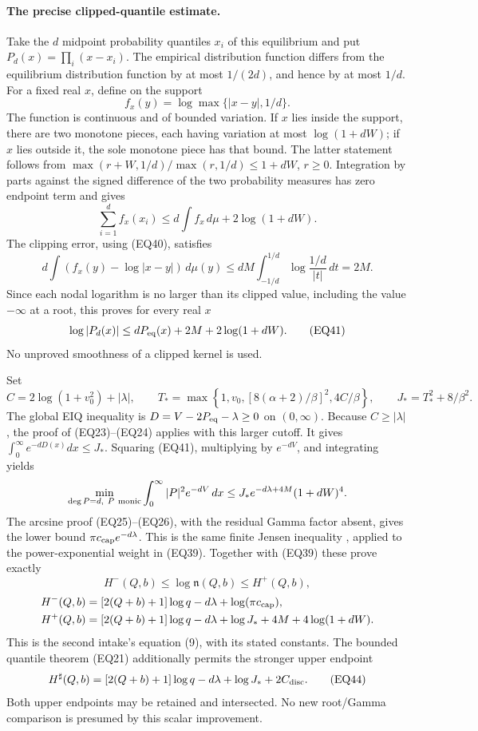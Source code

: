 \paragraph{The precise clipped-quantile estimate.}
Take the \(d\) midpoint probability quantiles \(x_i\) of this equilibrium
and put \(P_d(x)=\prod_i(x-x_i)\).  The empirical distribution function
differs from the equilibrium distribution function by at most \(1/(2d)\),
and hence by at most \(1/d\).  For a fixed real \(x\), define on the
support
\[
 f_x(y)=\log\max\{|x-y|,1/d\}.
\]
The function is continuous and of bounded variation.  If \(x\) lies
inside the support, there are two monotone pieces, each having variation
at most \(\log(1+dW)\); if \(x\) lies outside it, the sole monotone
piece has that bound.  The latter statement follows from
\(\max(r+W,1/d)/\max(r,1/d)\le1+dW\), \(r\ge0\).
Integration by parts against the signed difference of the two
probability measures has zero endpoint term and gives
\[
 \sum_{i=1}^d f_x(x_i)\le
 d\int f_x\,d\mu+2\log(1+dW).
\]
The clipping error, using (EQ40), satisfies
\[
 d\int(f_x(y)-\log|x-y|)\,d\mu(y)
 \le dM\int_{-1/d}^{1/d}\log\frac{1/d}{|t|}\,dt=2M.
\]
Since each nodal logarithm is no larger than its clipped value, including
the value \(-\infty\) at a root, this proves for every real \(x\)
\[
 \log|P_d(x)|\le dP_{\rm eq}(x)+2M+2\log(1+dW).
\tag{EQ41}
\]
No unproved smoothness of a clipped kernel is used.

Set
\[
 C=2\log(1+v_0^2)+|\lambda|,\qquad
 T_*=\max\left\{1,v_0,
       [8(\alpha+2)/\beta]^2,4C/\beta\right\},\qquad
 J_*=T_*^2+8/\beta^2.
\tag{EQ42}
\]
The global EIQ inequality is \(D=V-2P_{\rm eq}-\lambda\ge0\) on
\((0,\infty)\).  Because \(C\ge|\lambda|\), the proof of
(EQ23)--(EQ24) applies with this larger cutoff.  It gives
\(\int_0^\infty e^{-dD(x)}dx\le J_*\).
Squaring (EQ41), multiplying by \(e^{-dV}\), and integrating yields
\[
 \min_{\deg P=d,\ P\ {\rm monic}}\int_0^\infty|P|^2e^{-dV}\,dx
 \le J_*e^{-d\lambda+4M}(1+dW)^4.
\]
The arcsine proof (EQ25)--(EQ26), with the residual Gamma factor absent,
gives the lower bound \(\pi c_{\rm cap}e^{-d\lambda}\).
This is the same finite Jensen inequality
\cite[\S12.3, eq.~(12.3.4), pp.~300--301]{human:szego1975},
applied to the power-exponential weight in (EQ39).
Together with (EQ39) these prove exactly
\[
 H^-(Q,b)\le\log{\mathfrak n}(Q,b)\le H^+(Q,b),
\tag{EQ43}
\]
\[
 \begin{split}
 H^-(Q,b)&=[2(Q+b)+1]\log q-d\lambda+\log(\pi c_{\rm cap}),\\
 H^+(Q,b)&=[2(Q+b)+1]\log q-d\lambda
                  +\log J_*+4M+4\log(1+dW).
 \end{split}
\]
This is the second intake's equation (9), with its stated constants.
The bounded quantile theorem (EQ21) additionally permits the stronger
upper endpoint
\[
 H^\sharp(Q,b)=[2(Q+b)+1]\log q-d\lambda+\log J_*+2C_{\rm disc}.
\tag{EQ44}
\]
Both upper endpoints may be retained and intersected.  No new root/Gamma
comparison is presumed by this scalar improvement.

